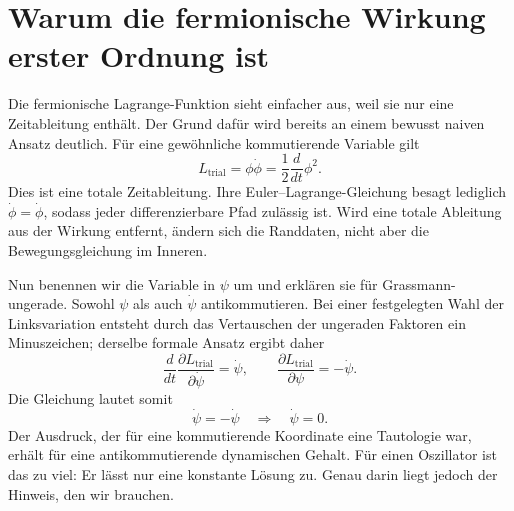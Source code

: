 \section{Warum die fermionische Wirkung erster Ordnung ist}

Die fermionische Lagrange-Funktion sieht einfacher aus, weil sie nur eine Zeitableitung enthält. Der Grund dafür wird bereits an einem bewusst naiven Ansatz deutlich. Für eine gewöhnliche kommutierende Variable gilt
\begin{equation}
L_{\mathrm{trial}}=\phi\dot\phi
=\frac{1}{2}\frac{d}{dt}\phi^2.
\end{equation}
Dies ist eine totale Zeitableitung. Ihre Euler--Lagrange-Gleichung besagt lediglich \(\dot\phi=\dot\phi\), sodass jeder differenzierbare Pfad zulässig ist. Wird eine totale Ableitung aus der Wirkung entfernt, ändern sich die Randdaten, nicht aber die Bewegungsgleichung im Inneren.

Nun benennen wir die Variable in \(\psi\) um und erklären sie für Grassmann-ungerade. Sowohl \(\psi\) als auch \(\dot\psi\) antikommutieren. Bei einer festgelegten Wahl der Linksvariation entsteht durch das Vertauschen der ungeraden Faktoren ein Minuszeichen; derselbe formale Ansatz ergibt daher
\begin{equation}
\frac{d}{dt}\frac{\partial L_{\mathrm{trial}}}{\partial\dot\psi}
=\dot\psi,
\qquad
\frac{\partial L_{\mathrm{trial}}}{\partial\psi}
=-\dot\psi.
\end{equation}
Die Gleichung lautet somit
\begin{equation}
\dot\psi=-\dot\psi
\quad\Longrightarrow\quad
\dot\psi=0.
\label{eq:l7-constant-fermion}
\end{equation}
Der Ausdruck, der für eine kommutierende Koordinate eine Tautologie war, erhält für eine antikommutierende dynamischen Gehalt. Für einen Oszillator ist das zu viel: Er lässt nur eine konstante Lösung zu. Genau darin liegt jedoch der Hinweis, den wir brauchen.

\begin{classroomqa}
\end{classroomqa}

